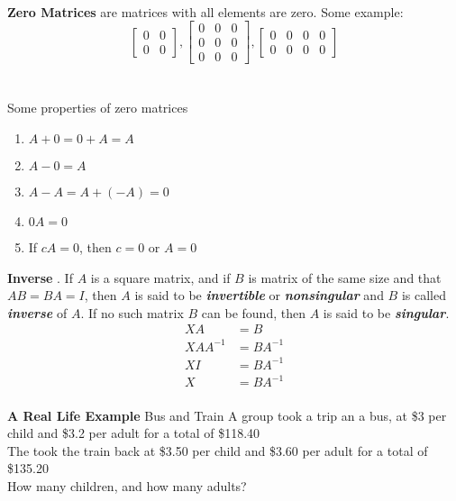 \documentclass[a4paper, 12pt]{article}
\begin{document}
\\
\textbf{Zero Matrices} are matrices with all elements are zero. Some example:
\[
\left[{
\begin{array}{cc}
0 & 0 \\
0 & 0
\end{array} 
} \right]
,
\left[{
\begin{array}{ccc}
0 & 0 & 0 \\
0 & 0 & 0 \\
0 & 0 & 0
\end{array}
}\right]
,
\left[{
\begin{array}{cccc}
0 & 0 & 0 & 0\\
0 & 0 & 0 & 0
\end{array}
}\right]
\]
\\
\\
Some properties of zero matrices
\\
\begin{enumerate}
\item $A + 0 = 0 + A = A$
\item $A - 0 = A$
\item $A - A = A + (-A) = 0$
\item $0A = 0$
\item If $cA = 0$, then $c = 0$ or $A = 0$
\end{enumerate}
\textbf{Inverse} . If $A$ is a square matrix, and if $B$ is matrix of 
the same size and that $AB = BA = I$, then $A$ is said to be 
\textit{\textbf{invertible}} or \textit{\textbf{nonsingular}} and $B$
is called \textit{\textbf{inverse}} of $A$. If no such matrix $B$
can be found, then $A$ is said to be \textit{\textbf{singular}}.
\\
\begin{align*}
XA &= B \\
XAA^{-1} &= BA^{-1} \\
XI &= BA^{-1} \\
X &= BA^{-1} 
\end{align*}
\\
\textbf{A Real Life Example} Bus and Train
A group took a trip an a bus, at  \$3 per child and \$3.2 per adult for 
a total of \$118.40\\
The took the train back at \$3.50 per child and \$3.60 per adult for a 
total of \$135.20\\
How many children, and how many adults?
\end{document}
